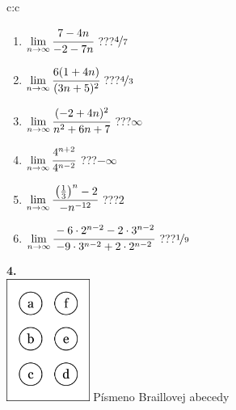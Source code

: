 \documentclass[10pt]{report}
\begin{document}
\begin{tabular}{c:c}
\begin{minipage}[c][104.5mm][t]{0.5\linewidth}
\begin{center}
\begin{minipage}{0.79\linewidth}
\begin{center}
\begin{varwidth}{\linewidth}
\begin{enumerate}
\normalsize
\item $\lim\limits_{n\to\infty}\cfrac{7-4n}{-2-7n}$\quad \dotfill\; ???\;\dotfill \quad $\nicefrac{4}{7}$
\item $\lim\limits_{n\to\infty}\cfrac{6(1+4n)}{(3n+5)^2}$\quad \dotfill\; ???\;\dotfill \quad $\nicefrac{4}{3}$
\item $\lim\limits_{n\to\infty}\cfrac{(-2+4n)^2}{n^2+6n+7}$\quad \dotfill\; ???\;\dotfill \quad $\infty$
\item $\lim\limits_{n\to\infty}\cfrac{4^{n+2}}{4^{n-2}}$\quad \dotfill\; ???\;\dotfill \quad $-\infty$
\item $\lim\limits_{n\to\infty}\cfrac{\left(\frac{1}{3}\right)^n -2}{-n^{-12}}$\quad \dotfill\; ???\;\dotfill \quad $2$
\item $\lim\limits_{n\to\infty}\cfrac{-6\cdot 2^{n-2}-2\cdot 3^{n-2}}{-9\cdot 3^{n-2}+2\cdot 2^{n-2}}$\quad \dotfill\; ???\;\dotfill \quad $\nicefrac{1}{9}$
\end{enumerate}
\end{varwidth}
\end{center}
\end{minipage}
\begin{minipage}{0.20\linewidth}
\begin{center}
{\Huge\bfseries 4.} \\[2mm]
\includegraphics[height=40mm]{../images/braille.png}
{\small Písmeno Braillovej abecedy}
\end{center}
\end{minipage}
\end{center}
\end{minipage}
%
\end{tabular}
\newpage
\thispagestyle{empty}
\end{document}
